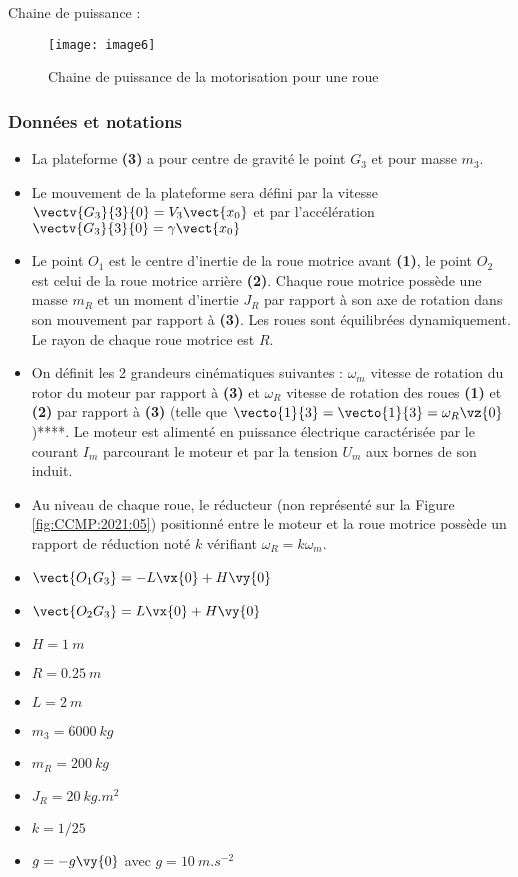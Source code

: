 Chaine de puissance :
\begin{figure}[!h]
\centering
\texttt{[image: image6]}
\caption{ \label{fig:CCMP:2021:06} Chaine de puissance de la motorisation pour une roue}
\end{figure} 
 



\subsubsection*{Données et notations}
\begin{itemize}
     \item La plateforme \textbf{(3)} a pour centre de gravité le point $G_3$ et pour masse $m_3$.
     \item Le mouvement de la plateforme sera défini par la vitesse $\vectv{G_3}{3}{0}=  V_3\vect{x_0}$ et par l'accélération $\vectv{G_3}{3}{0}=  \gamma \vect{x_0}$
     \item Le point $O_1$ est le centre d’inertie de la roue motrice avant \textbf{(1)}, le point $O_2$ est celui de la roue motrice arrière \textbf{(2)}. Chaque roue motrice possède une masse $m_R$ et un moment d'inertie $J_R$ par rapport à son axe de rotation dans son mouvement par rapport à \textbf{(3)}. Les roues sont équilibrées dynamiquement. Le rayon de chaque roue motrice est $R$.
     \item On définit les 2 grandeurs cinématiques suivantes : $\omega_m$ vitesse de rotation du rotor du moteur par rapport à \textbf{(3)} et $\omega_R$ vitesse de rotation des roues \textbf{(1)} et \textbf{(2)} par rapport à \textbf{(3)} (telle que $\vecto{1}{3}=\vecto{1}{3}=\omega_R \vz{0}$)****. Le moteur est alimenté en puissance électrique caractérisée par le courant $I_m$ parcourant le moteur et par la tension $U_m$ aux bornes de son induit.
     \item Au niveau de chaque roue, le réducteur (non représenté sur la Figure \ref{fig:CCMP:2021:05}) positionné entre le moteur et la roue motrice possède un rapport de réduction noté $k$ vérifiant $\omega_R= k \omega_m$.
\end{itemize}

\begin{multicols}{3}
\begin{itemize}
     \item $\vect{O_1 G_3} =-L\vx{0}+H\vy{0}$
     \item $\vect{O_2 G_3} =L\vx{0}+H\vy{0}$
     \item $H=\SI{1}{m}$
     \item $R=\SI{0,25}{m}$
     \item $L=\SI{2}{m}$
     \item $m_3=\SI{6000}{kg}$
     \item $m_R=\SI{200}{kg}$
     \item $J_R=\SI{20}{kg.m^2}$
     \item $k=1/25$
     \item $g=-g\vy{0}$ avec $g=\SI{10}{m.s^{-2}}$
\end{itemize} 
\end{multicols}

